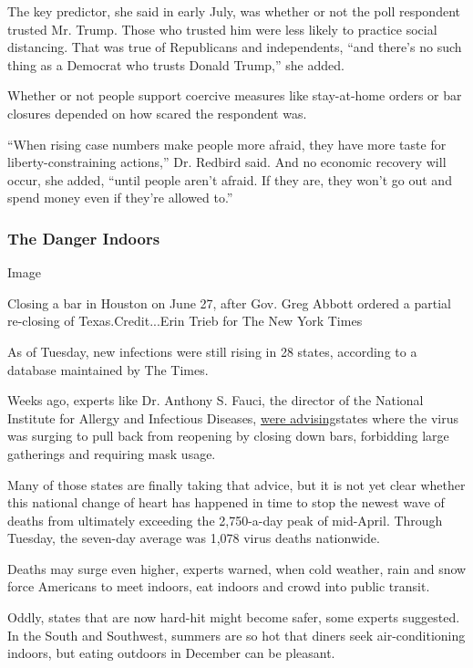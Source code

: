 The key predictor, she said in early July, was whether or not the poll
respondent trusted Mr. Trump. Those who trusted him were less likely to
practice social distancing. That was true of Republicans and
independents, ``and there's no such thing as a Democrat who trusts
Donald Trump,'' she added.

Whether or not people support coercive measures like stay-at-home orders
or bar closures depended on how scared the respondent was.

``When rising case numbers make people more afraid, they have more taste
for liberty-constraining actions,'' Dr. Redbird said. And no economic
recovery will occur, she added, ``until people aren't afraid. If they
are, they won't go out and spend money even if they're allowed to.''

\hypertarget{the-danger-indoors}{%
\subsubsection{The Danger Indoors}\label{the-danger-indoors}}

Image

Closing a bar in Houston on June 27, after Gov. Greg Abbott ordered a
partial re-closing of Texas.Credit...Erin Trieb for The New York Times

As of Tuesday, new infections were still rising in 28 states, according
to a database maintained by The Times.

Weeks ago, experts like Dr. Anthony S. Fauci, the director of the
National Institute for Allergy and Infectious Diseases,
\href{https://www.pbs.org/newshour/show/how-fauci-says-the-u-s-can-get-control-of-the-pandemic}{were
advising}states where the virus was surging to pull back from reopening
by closing down bars, forbidding large gatherings and requiring mask
usage.

Many of those states are finally taking that advice, but it is not yet
clear whether this national change of heart has happened in time to stop
the newest wave of deaths from ultimately exceeding the 2,750-a-day peak
of mid-April. Through Tuesday, the seven-day average was 1,078 virus
deaths nationwide.

Deaths may surge even higher, experts warned, when cold weather, rain
and snow force Americans to meet indoors, eat indoors and crowd into
public transit.

Oddly, states that are now hard-hit might become safer, some experts
suggested. In the South and Southwest, summers are so hot that diners
seek air-conditioning indoors, but eating outdoors in December can be
pleasant.

